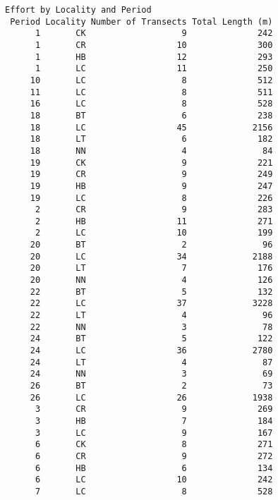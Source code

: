 \documentclass[
]{article}
\begin{document}
\begin{verbatim}
Effort by Locality and Period
 Period Locality Number of Transects Total Length (m)
      1       CK                   9              242
      1       CR                  10              300
      1       HB                  12              293
      1       LC                  11              250
     10       LC                   8              512
     11       LC                   8              511
     16       LC                   8              528
     18       BT                   6              238
     18       LC                  45             2156
     18       LT                   6              182
     18       NN                   4               84
     19       CK                   9              221
     19       CR                   9              249
     19       HB                   9              247
     19       LC                   8              226
      2       CR                   9              283
      2       HB                  11              271
      2       LC                  10              199
     20       BT                   2               96
     20       LC                  34             2188
     20       LT                   7              176
     20       NN                   4              126
     22       BT                   5              132
     22       LC                  37             3228
     22       LT                   4               96
     22       NN                   3               78
     24       BT                   5              122
     24       LC                  36             2780
     24       LT                   4               87
     24       NN                   3               69
     26       BT                   2               73
     26       LC                  26             1938
      3       CR                   9              269
      3       HB                   7              184
      3       LC                   9              167
      6       CK                   8              271
      6       CR                   9              272
      6       HB                   6              134
      6       LC                  10              242
      7       LC                   8              528


\end{verbatim}
\end{document}
